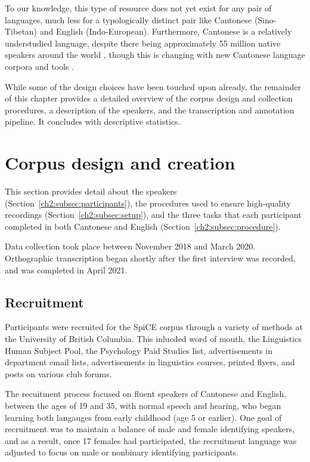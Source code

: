 To our knowledge, this type of resource does not yet exist for any pair of languages, much less for a typologically distinct pair like Cantonese (Sino-Tibetan) and English (Indo-European). Furthermore, Cantonese is a relatively understudied language, despite there being approximately 55 million native speakers around the world \citep{matthews_2013_cantonese}, though this is changing with new Cantonese language corpora \citep{luke_2015_hkc,leung_2001_hkcac,winterstein_2020_cantomap,alderete_2019_tone} and tools \citep{lee_2018_pycantonese,yau_2019_pyjyutping}.

While some of the design choices have been touched upon already, the remainder of this chapter provides a detailed overview of the corpus design and collection procedures, a description of the speakers, and the transcription and annotation pipeline. It concludes with descriptive statistics. 

\section{Corpus design and creation}\label{ch2:sec:design}

This section provides detail about the speakers (Section~\ref{ch2:subsec:participants}), the procedures used to ensure high-quality recordings (Section~\ref{ch2:subsec:setup}), and the three tasks that each participant completed in both Cantonese and English (Section~\ref{ch2:subsec:procedure}). 

Data collection took place between November 2018 and March 2020. Orthographic transcription began shortly after the first interview was recorded, and was completed in April 2021.

\subsection{Recruitment}

Participants were recruited for the SpiCE corpus through a variety of methods at the University of British Columbia. This inlucded word of mouth, the Linguistics Human Subject Pool, the Psychology Paid Studies list, advertisements in department email lists, advertisements in linguistics courses, printed flyers, and posts on various club forums. 

The recuitment process focused on fluent speakers of Cantonese and English, between the ages of 19 and 35, with normal speech and hearing, who began learning both langauges from early childhood (age 5 or earlier). One goal of recruitment was to maintain a balance of male and female identifying speakers, and as a result, once 17 females had participated, the recruitment language was adjusted to focus on male or nonbinary identifying participants.

